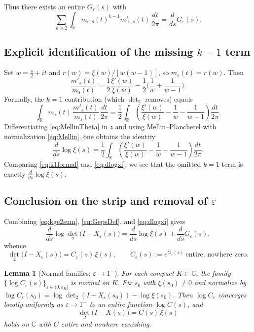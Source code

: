 \documentclass[11pt]{article}
\numberwithin{equation}{section}
\newtheorem{lemma}[theorem]{Lemma}
\theoremstyle{definition}
\theoremstyle{remark}
\newcommand{\C}{\mathbb{C}}
\newcommand{\R}{\mathbb{R}}
\newcommand{\eps}{\varepsilon}
\newcommand{\Dettwo}{\operatorname{det}_2}
\newcommand{\1}{\mathbbm{1}}
\begin{document}
Thus there exists an entire \(G_\eps(s)\) with
\begin{equation}\label{eq:GepsDef}
\sum_{k\ge 2}\int_{\R} m_{\eps,s}(t)^{k-1} m'_{\eps,s}(t)\,\frac{dt}{2\pi}
= \frac{d}{ds} G_\eps(s).
\end{equation}

\subsection{Explicit identification of the missing \texorpdfstring{$k=1$}{k=1} term}
Set \(w=\tfrac{s}{2}+it\) and \(r(w)=\xi(w)/[w(w-1)]\), so \(m_s(t)=r(w)\). Then
\[
\frac{m'_s(t)}{m_s(t)}=\frac12\frac{\xi'(w)}{\xi(w)} - \frac12\Big(\frac{1}{w}+\frac{1}{w-1}\Big).
\]
Formally, the \(k=1\) contribution (which \(\Dettwo\) removes) equals
\begin{equation}\label{eq:k1formal}
\int_{\R} m_s(t)\,\frac{m'_s(t)}{m_s(t)}\,\frac{dt}{2\pi}
=\frac12\int_{\R}\!\left(\frac{\xi'(w)}{\xi(w)}-\frac{1}{w}-\frac{1}{w-1}\right)\frac{dt}{2\pi}.
\end{equation}
Differentiating \eqref{eq:MellinTheta} in \(z\) and using Mellin--Plancherel with normalization \eqref{eq:Mellin}, one obtains the identity
\begin{equation}\label{eq:dlogxi}
\frac{d}{ds}\log \xi(s)
=\frac12\int_{\R}\!\left(\frac{\xi'(w)}{\xi(w)}-\frac{1}{w}-\frac{1}{w-1}\right)\frac{dt}{2\pi}.
\end{equation}
Comparing \eqref{eq:k1formal} and \eqref{eq:dlogxi}, we see that the omitted \(k=1\) term is exactly \(\frac{d}{ds}\log\xi(s)\).

\subsection{Conclusion on the strip and removal of \texorpdfstring{$\eps$}{epsilon}}
Combining \eqref{eq:kge2sum}, \eqref{eq:GepsDef}, and \eqref{eq:dlogxi} gives
\[
\frac{d}{ds}\log \Dettwo\!\big(I-X_\eps(s)\big)=\frac{d}{ds}\log \xi(s)+\frac{d}{ds} G_\eps(s),
\]
whence
\begin{equation}\label{eq:epsIdentity}
\Dettwo\!\big(I-X_\eps(s)\big)= C_\eps(s)\,\xi(s),\qquad C_\eps(s):=e^{G_\eps(s)}\ \text{entire, nowhere zero}.
\end{equation}

\begin{lemma}[Normal families; \(\eps\to1^-\)]\label{lem:NormalFamilies}
For each compact \(K\subset\C\), the family \(\{\log C_\eps(s)\}_{\eps\in(0,\eps_K]}\) is normal on \(K\). Fix \(s_0\) with \(\xi(s_0)\neq 0\) and normalize by \(\log C_\eps(s_0)=\log \Dettwo(I-X_\eps(s_0))-\log \xi(s_0)\). Then \(\log C_\eps\) converges locally uniformly as \(\eps\to1^-\) to an entire function \(\log C(s)\), and
\begin{equation}\label{eq:MainAfterEps}
\Dettwo\!\big(I-X(s)\big)=C(s)\,\xi(s)
\end{equation}
holds on \(\C\) with \(C\) entire and nowhere vanishing.
\end{lemma}
\end{document}
